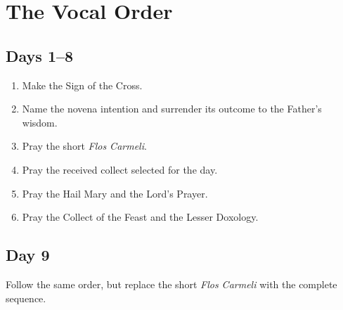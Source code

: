 
\section{The Vocal Order}


\subsection{Days 1--8}

\begin{enumerate}
\item Make the Sign of the Cross.
\item Name the novena intention and surrender its outcome to the Father's wisdom.
\item Pray the short \textit{Flos Carmeli}.
\item Pray the received collect selected for the day.
\item Pray the Hail Mary and the Lord's Prayer.
\item Pray the Collect of the Feast and the Lesser Doxology.
\end{enumerate}

\subsection{Day 9}

Follow the same order, but replace the short \textit{Flos Carmeli} with the complete sequence.

